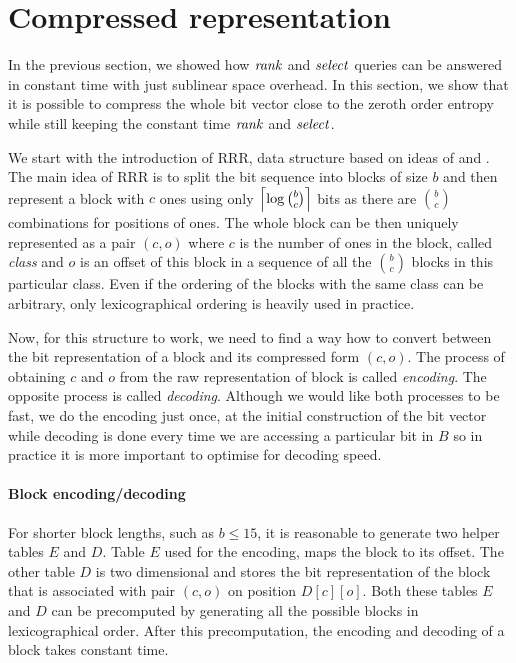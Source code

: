 \section{Compressed representation}
\label{section:compressed_bv}

In the previous section, we showed how $\mathit{rank}$ and $\mathit{select}$ queries can be answered in constant
time with just sublinear space overhead. In this section, we show that it is possible to compress
the whole bit vector close to the zeroth order entropy while still keeping the constant time $\mathit{rank}$
and $\mathit{select}$.

We start with the introduction of RRR, data structure based on ideas of \cite{pagh2001low} and
\cite{raman2007succinct}. The main idea of RRR is to split the bit sequence into blocks of size
$b$ and then represent a block with $c$ ones using only $\left\lceil \log {b \choose c} \right\rceil$ bits as
there are ${b \choose c}$ combinations for positions of ones. The whole block can be then uniquely
represented as a pair $(c, o)$ where $c$ is the number of ones in the block, called \emph{class} and
$o$ is an offset of this block in a sequence of all the ${b \choose c}$ blocks in this particular class.
Even if the ordering of the blocks with the same class can be arbitrary, only lexicographical ordering
is heavily used in practice.

Now, for this structure to work, we need to find a way how to convert between the bit representation of
a block and its compressed form $(c, o)$. The process of obtaining $c$ and $o$ from the raw representation
of block is called \textit{encoding}. The opposite process is called \textit{decoding}. Although
we would like both processes to be fast, we do the encoding just once, at the initial construction
of the bit vector while decoding is done every time we are accessing a particular bit in $B$ so in practice
it is more important to optimise for decoding speed.

\paragraph{Block encoding/decoding}

For shorter block lengths, such as $b\leq 15$, it is reasonable to generate two helper tables $E$ and $D$.
Table $E$ used for the encoding, maps the block to its offset. The other table $D$ is two dimensional and
stores the bit representation of the block that is associated with pair $(c, o)$ on position $D[c][o]$.
Both these tables $E$ and $D$ can be precomputed by generating all the possible blocks in lexicographical
order. After this precomputation, the encoding and decoding of a block takes constant time.

